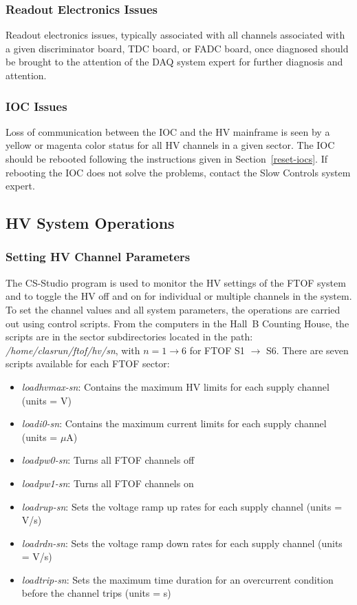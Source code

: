 \documentclass[12pt]{article}
\begin{document}
\subsubsection{Readout Electronics Issues}
\label{readout-issues}

Readout electronics issues, typically associated with all channels associated with a 
given discriminator board, TDC board, or FADC board, once diagnosed should be brought 
to the attention of the DAQ system expert for further diagnosis and attention.

\subsubsection{IOC Issues}
\label{ioc-issues}

Loss of communication between the IOC and the HV mainframe is seen by a yellow or 
magenta color status for all HV channels in a given sector. The IOC should be rebooted 
following the instructions given in Section~\ref{reset-iocs}. If rebooting the IOC does 
not solve the problems, contact the Slow Controls system expert.

\subsection{HV System Operations}

\subsubsection{Setting HV Channel Parameters}
\label{hv-parms}

The CS-Studio program is used to monitor the HV settings of the FTOF system and to 
toggle the HV off and on for individual or multiple channels in the system. To set 
the channel values and all system parameters, the operations are carried out using 
control scripts. From the computers in the Hall~B Counting House, the scripts are 
in the sector subdirectories located in the path: {\it /home/clasrun/ftof/hv/sn}, 
with $n = 1 \to 6$ for FTOF S1 $\to$ S6. There are seven scripts available for 
each FTOF sector:

\begin{itemize}
\item {\it loadhvmax-sn}: Contains the maximum HV limits for each supply channel (units 
= V)
\item {\it loadi0-sn}: Contains the maximum current limits for each supply channel 
(units = $\mu$A)
\item {\it loadpw0-sn}: Turns all FTOF channels off
\item {\it loadpw1-sn}: Turns all FTOF channels on
\item {\it loadrup-sn}: Sets the voltage ramp up rates for each supply channel (units 
= V/s)
\item {\it loadrdn-sn}: Sets the voltage ramp down rates for each supply channel (units 
= V/s)
\item {\it loadtrip-sn}: Sets the maximum time duration for an overcurrent condition 
before the channel trips (units = s)
\end{itemize}
\end{document}
